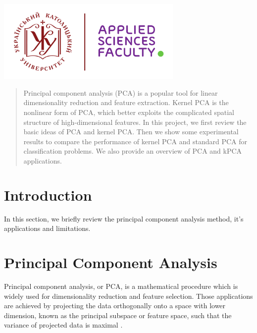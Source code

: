 \begin{titlepage}

\includegraphics[height=4cm]{img/UCU-Apps.png}\\[1cm] %
 

\vfill %

\end{titlepage}


\begin{abstract}
Principal component analysis (PCA) is a
popular tool for linear dimensionality reduction
and feature extraction. Kernel PCA
is the nonlinear form of PCA, which better
exploits the complicated spatial structure of
high-dimensional features. In this project, we
first review the basic ideas of PCA and kernel
PCA. Then we show some experimental
results to compare the performance
of kernel PCA and standard PCA for classification
problems. We also provide an overview of PCA and kPCA applications.
\end{abstract}

\section{Introduction}
In this section, we briefly review the principal component
analysis method, it's applications and limitations.

\section{Principal Component Analysis}
Principal component analysis, or PCA, is a mathematical procedure which is widely used for dimensionality reduction and feature selection. Those applications are achieved by projecting the data orthogonally onto a space with lower dimension, known as the principal subspace or feature space, such that the variance of projected data is maximal \citep*{bishop}.

